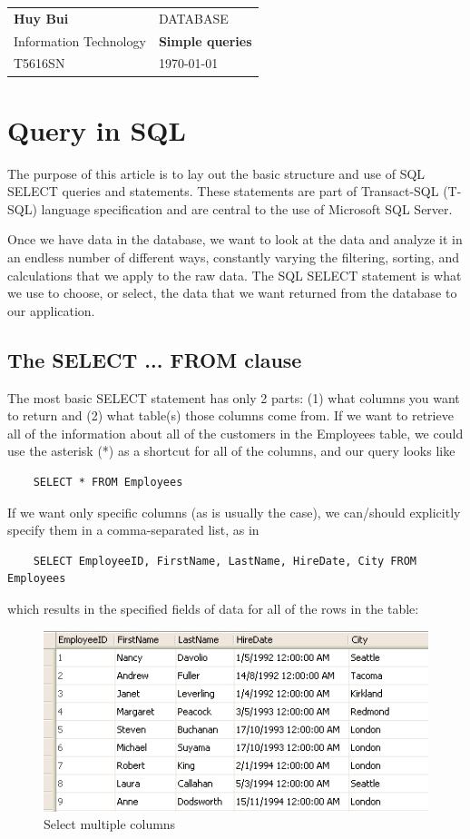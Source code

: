 \documentclass[10pt,a4paper]{article}
\author{Huy Bui}
\begin{document}
\begin{tabular}{p{8cm}l}
	\textbf{Huy Bui}		&	\textsc{DATABASE}			\\
	Information Technology	&	\textbf{Simple queries}	\\
	T5616SN					&	\today				\\
\end{tabular}
\section{Query in SQL}
The purpose of this article is to lay out the basic structure and use of SQL SELECT queries and statements. These statements are part of Transact-SQL (T-SQL) language specification and are central to the use of Microsoft SQL Server.\par 
Once we have data in the database, we want to look at the data and analyze it in an endless number of different ways, constantly varying the filtering, sorting, and calculations that we apply to the raw data. The SQL SELECT statement is what we use to choose, or select, the data that we want returned from the database to our application.
\subsection{The SELECT ... FROM clause}
The most basic SELECT statement has only 2 parts: (1) what columns you want to return and (2) what table(s) those columns come from. If we want to retrieve all of the information about all of the customers in the Employees table, we could use the asterisk (*) as a shortcut for all of the columns, and our query looks like
\begin{lstlisting}
	SELECT * FROM Employees
\end{lstlisting}
If we want only specific columns (as is usually the case), we can/should explicitly specify them in a comma-separated list, as in
\begin{lstlisting}
	SELECT EmployeeID, FirstName, LastName, HireDate, City FROM Employees
\end{lstlisting}
which results in the specified fields of data for all of the rows in the table:
\begin{figure}[hbtp]
	\centering
	\includegraphics[scale=1]{example.png}
	\caption{Select multiple columns}
	\end{figure}
 
\end{document}

